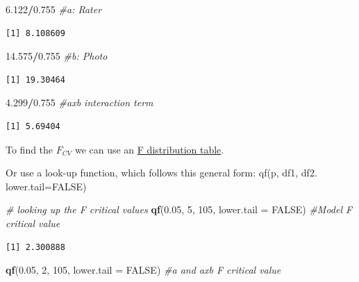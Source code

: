 \documentclass[
  11pt,
]{book}
\newenvironment{Shaded}{\begin{snugshade}}{\end{snugshade}}
\newcommand{\AttributeTok}[1]{\textcolor[rgb]{0.27,0.27,0.27}{#1}}
\newcommand{\CommentTok}[1]{\textcolor[rgb]{0.37,0.37,0.37}{\textit{#1}}}
\newcommand{\ConstantTok}[1]{\textcolor[rgb]{0.37,0.37,0.37}{#1}}
\newcommand{\DecValTok}[1]{\textcolor[rgb]{0.06,0.06,0.06}{#1}}
\newcommand{\FloatTok}[1]{\textcolor[rgb]{0.06,0.06,0.06}{#1}}
\newcommand{\FunctionTok}[1]{\textcolor[rgb]{0.27,0.27,0.27}{\textbf{#1}}}
\newcommand{\NormalTok}[1]{#1}
\newcommand{\SpecialCharTok}[1]{\textcolor[rgb]{0.43,0.43,0.43}{\textbf{#1}}}
\begin{document}
\begin{Shaded}
\begin{Highlighting}[]
\FloatTok{6.122}\SpecialCharTok{/}\FloatTok{0.755}  \CommentTok{\#a: Rater}
\end{Highlighting}
\end{Shaded}

\begin{verbatim}
[1] 8.108609
\end{verbatim}

\begin{Shaded}
\begin{Highlighting}[]
\FloatTok{14.575}\SpecialCharTok{/}\FloatTok{0.755}  \CommentTok{\#b:  Photo}
\end{Highlighting}
\end{Shaded}

\begin{verbatim}
[1] 19.30464
\end{verbatim}

\begin{Shaded}
\begin{Highlighting}[]
\FloatTok{4.299}\SpecialCharTok{/}\FloatTok{0.755}  \CommentTok{\#axb interaction term}
\end{Highlighting}
\end{Shaded}

\begin{verbatim}
[1] 5.69404
\end{verbatim}

To find the \(F_{CV}\) we can use an \href{https://www.statology.org/f-distribution-table/}{F distribution table}.

Or use a look-up function, which follows this general form: qf(p, df1, df2. lower.tail=FALSE)

\begin{Shaded}
\begin{Highlighting}[]
\CommentTok{\# looking up the F critical values}
\FunctionTok{qf}\NormalTok{(}\FloatTok{0.05}\NormalTok{, }\DecValTok{5}\NormalTok{, }\DecValTok{105}\NormalTok{, }\AttributeTok{lower.tail =} \ConstantTok{FALSE}\NormalTok{)  }\CommentTok{\#Model F critical value}
\end{Highlighting}
\end{Shaded}

\begin{verbatim}
[1] 2.300888
\end{verbatim}

\begin{Shaded}
\begin{Highlighting}[]
\FunctionTok{qf}\NormalTok{(}\FloatTok{0.05}\NormalTok{, }\DecValTok{2}\NormalTok{, }\DecValTok{105}\NormalTok{, }\AttributeTok{lower.tail =} \ConstantTok{FALSE}\NormalTok{)  }\CommentTok{\#a and axb F critical value}
\end{Highlighting}
\end{Shaded}
\end{document}

